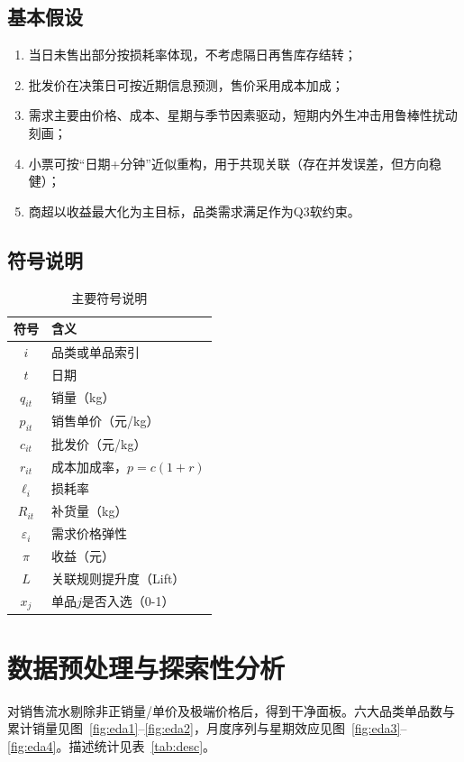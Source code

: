 \documentclass[UTF8,a4paper,12pt]{ctexart}
\begin{document}
\subsection{基本假设}
\begin{enumerate}[leftmargin=2em]
\item 当日未售出部分按损耗率体现，不考虑隔日再售库存结转；
\item 批发价在决策日可按近期信息预测，售价采用成本加成；
\item 需求主要由价格、成本、星期与季节因素驱动，短期内外生冲击用鲁棒性扰动刻画；
\item 小票可按``日期+分钟''近似重构，用于共现关联（存在并发误差，但方向稳健）；
\item 商超以收益最大化为主目标，品类需求满足作为Q3软约束。
\end{enumerate}

\subsection{符号说明}
\begin{table}[H]
\centering
\caption{主要符号说明}
\begin{tabular}{cl}
\toprule
符号 & 含义 \\
\midrule
$i$ & 品类或单品索引 \\
$t$ & 日期 \\
$q_{it}$ & 销量（kg） \\
$p_{it}$ & 销售单价（元/kg） \\
$c_{it}$ & 批发价（元/kg） \\
$r_{it}$ & 成本加成率，$p=c(1+r)$ \\
$\ell_i$ & 损耗率 \\
$R_{it}$ & 补货量（kg） \\
$\varepsilon_i$ & 需求价格弹性 \\
$\pi$ & 收益（元） \\
$L$ & 关联规则提升度（Lift） \\
$x_j$ & 单品$j$是否入选（0-1） \\
\bottomrule
\end{tabular}
\end{table}

\section{数据预处理与探索性分析}
对销售流水剔除非正销量/单价及极端价格后，得到干净面板。六大品类单品数与累计销量见图~\ref{fig:eda1}--\ref{fig:eda2}，月度序列与星期效应见图~\ref{fig:eda3}--\ref{fig:eda4}。描述统计见表~\ref{tab:desc}。
\end{document}
